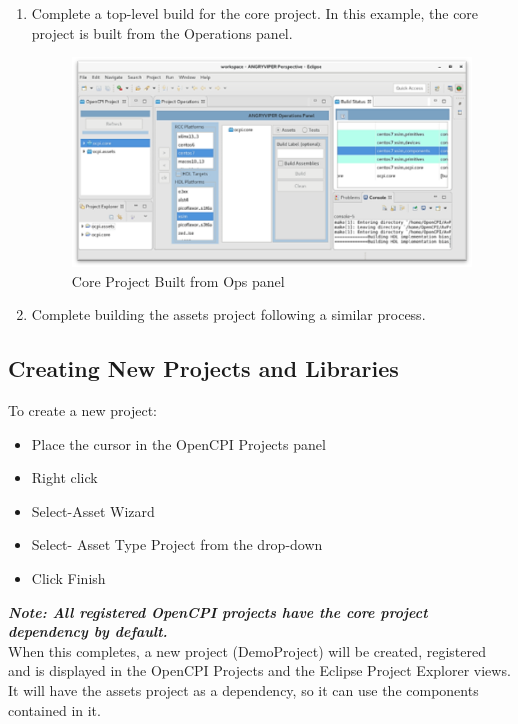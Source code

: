 \documentclass[10pt, a4paper, oneside]{article}
\begin{document}
\begin{enumerate}
\item	Complete a top-level build for the core project. In this example, the core project is built from the Operations panel.
\begin{figure}[h!]
	\centering
	\caption{Core Project Built from Ops panel}\label{fig:Core Project Built from Ops panel}
	\includegraphics[width=.90\textwidth]{CoreProjectBuiltfromOpsPanel.png}
 \end{figure}

\item	Complete building the assets project following a similar process.
\end{enumerate}

\subsection{Creating New Projects and Libraries}
To create a new project:
\begin{itemize}
\item	Place the cursor in the OpenCPI Projects panel
\item	Right click
\item Select-Asset Wizard
\item	Select- Asset Type Project from the drop-down
\item	Click Finish
\end{itemize}
\textbf{\emph{Note: All registered OpenCPI projects have the core project dependency by default.}}\\

When this completes, a new project (DemoProject) will be created, registered and is displayed in the OpenCPI Projects and the Eclipse Project Explorer views. It will have the assets project as a dependency, so it can use the components contained in it. \\
\end{document}
